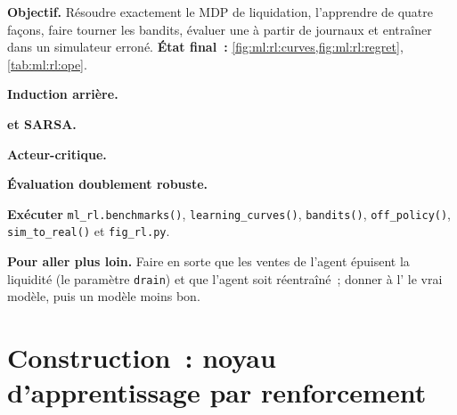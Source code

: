 \begin{tutorial}
\textbf{Objectif.} Résoudre exactement le MDP de liquidation, l'apprendre de quatre façons, faire tourner les bandits, évaluer une  à partir de journaux et entraîner
dans un simulateur erroné. \textbf{État final~:} \cref{fig:ml:rl:curves,fig:ml:rl:regret}, \cref{tab:ml:rl:ope}.
\begin{tutsteps}
\item \textbf{Induction arrière.}
\label{lst:ml:rl:solve}
\item \textbf{ et SARSA.}
\label{lst:ml:rl:qlearning}
\item \textbf{Acteur-critique.}
\label{lst:ml:rl:ac}
\item \textbf{Évaluation doublement robuste.}
\label{lst:ml:rl:dr}
\item \textbf{Exécuter} \texttt{ml\_rl.benchmarks()}, \texttt{learning\_curves()}, \texttt{bandits()}, \texttt{off\_policy()},
\texttt{sim\_to\_real()} et \texttt{fig\_rl.py}.
\end{tutsteps}
\textbf{Pour aller plus loin.} Faire en sorte que les ventes de l'agent épuisent la liquidité (le paramètre \texttt{drain}) et que l'agent soit réentraîné~; donner à
l' le vrai modèle, puis un modèle moins bon.
\end{tutorial}

\section{Construction~: noyau d'apprentissage par renforcement}\label{bld:ml:reinforcement-learning-foundations:rlcore}

